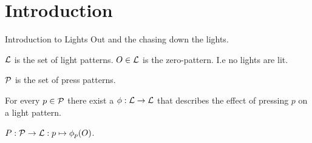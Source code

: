 \section{Introduction}

Introduction to Lights Out and the chasing down the lights.

\begin{definition}
  $\mathcal{L}$ is the set of light patterns. $O \in \mathcal{L}$ is the
  zero-pattern. I.e no lights are lit.

  $\mathcal{P}$ is the set of press patterns.

  For every $p\in\mathcal{P}$ there exist a $\phi : \mathcal{L} \rightarrow \mathcal{L}$ that
  describes the effect of pressing $p$ on a light pattern.

  $P : \mathcal{P} \rightarrow \mathcal{L} : p \mapsto \phi_{p}(O)$.
\end{definition}
